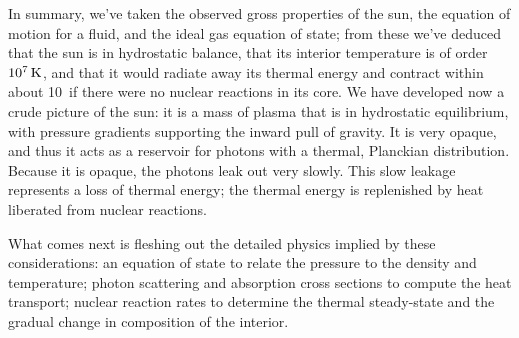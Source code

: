 In summary, we've taken the observed gross properties of the sun, the equation of motion for a fluid, and the ideal gas equation of state; from these we've deduced that the sun is in hydrostatic balance, that its interior temperature is of order $10^{7}\,\mathrm{K}$, and that it would radiate away its thermal energy and contract within about 10\nsp\Mega\yr\ if there were no nuclear reactions in its core.  We have developed now a crude picture of the sun: it is a mass of plasma that is in hydrostatic equilibrium, with pressure gradients supporting the inward pull of gravity.  It is very opaque, and thus it acts as a reservoir for photons with a thermal, Planckian distribution. Because it is opaque, the photons leak out very slowly.  This slow leakage represents a loss of thermal energy; the thermal energy is replenished by heat liberated from nuclear reactions.

What comes next is fleshing out the detailed physics implied by these considerations: an equation of state to relate the pressure to the density and temperature; photon scattering and absorption cross sections to compute the heat transport; nuclear reaction rates to determine the thermal steady-state and the gradual change in composition of the interior.
